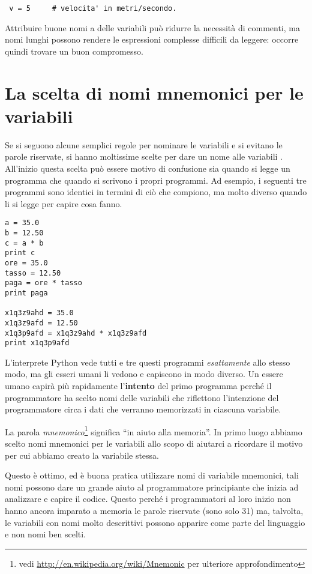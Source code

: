 \beforeverb \begin{verbatim} v = 5     # velocita' in metri/secondo.
\end{verbatim} \afterverb
%
Attribuire buone nomi a delle variabili pu\`{o} ridurre la necessit\`{a} di commenti, ma nomi lunghi possono rendere le espressioni complesse difficili da leggere: occorre quindi trovare un buon compromesso.

\section{La scelta di nomi mnemonici per le variabili}


Se si seguono alcune semplici regole per nominare le variabili e si evitano le parole riservate, si hanno moltissime scelte per dare un nome alle variabili . All'inizio questa scelta pu\`{o} essere motivo di confusione sia quando si legge un programma che quando si scrivono i propri programmi. Ad esempio, i seguenti tre programmi sono identici in termini di ci\`{o} che compiono, ma molto diverso quando li si legge per capire cosa fanno.

\beforeverb \begin{verbatim} 
a = 35.0 
b = 12.50 
c = a * b 
print c
ore = 35.0 
tasso = 12.50 
paga = ore * tasso 
print paga

x1q3z9ahd = 35.0 
x1q3z9afd = 12.50 
x1q3p9afd = x1q3z9ahd * x1q3z9afd
print x1q3p9afd \end{verbatim} \afterverb
%
L'interprete Python vede tutti e tre questi programmi \emph{esattamente} allo stesso modo, ma gli esseri umani li vedono e capiscono in modo diverso. Un essere umano capir\`{a} pi\`{u} rapidamente l'\textbf{intento} del primo programma perch\'{e} il programmatore ha scelto nomi delle variabili che riflettono l'intenzione del programmatore circa i dati che verranno memorizzati in ciascuna variabile.

La parola \emph{mnemonico}\footnote{	 vedi \url{http://en.wikipedia.org/wiki/Mnemonic} per ulteriore approfondimento} significa {``}in aiuto alla memoria''. In primo luogo abbiamo scelto nomi mnemonici per le variabili allo scopo di aiutarci a ricordare il motivo per cui abbiamo creato la variabile stessa.


Questo \`{e} ottimo, ed \`{e} buona pratica utilizzare nomi di variabile mnemonici, tali nomi possono dare un grande aiuto al programmatore principiante che inizia ad analizzare e capire il codice. Questo perch\'{e} i programmatori al loro inizio non hanno ancora imparato a memoria le parole riservate (sono solo 31) ma, talvolta, le variabili con nomi molto descrittivi possono apparire come parte del linguaggio e non nomi ben scelti.


